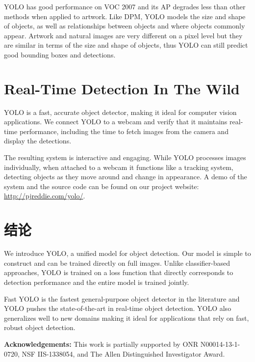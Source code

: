 \documentclass[10pt,twocolumn,letterpaper]{article}
\begin{document}
YOLO has good performance on VOC 2007 and its AP degrades less than other methods when applied to artwork. Like DPM, YOLO models the size and shape
of objects, as well as relationships between objects and where objects commonly appear. Artwork and natural images are very different on a pixel level but they are similar in terms of the size and shape of objects, thus YOLO can still predict good bounding boxes and detections.

\section{Real-Time Detection In The Wild}

YOLO is a fast, accurate object detector, making it ideal for computer vision applications. We connect YOLO to a webcam and verify that it maintains real-time performance, including the time to fetch images from the camera and display the detections.

The resulting system is interactive and engaging. While YOLO processes images individually, when attached to a webcam it functions like a tracking system, detecting objects as they move around and change in appearance. A demo of the system and the source code can be found on our project website: \url{http://pjreddie.com/yolo/}.



\section{结论}

We introduce YOLO, a unified model for object detection. Our model is simple to construct and can be trained directly on full images. Unlike classifier-based approaches, YOLO is trained on a loss function that directly corresponds to detection performance and the entire model is trained jointly.

Fast YOLO is the fastest general-purpose object detector in the literature and YOLO pushes the state-of-the-art in real-time object detection. YOLO also generalizes well to new domains making it ideal for applications that rely on fast, robust object detection.

\noindent\textbf{Acknowledgements:} This work is partially supported by ONR N00014-13-1-0720, NSF IIS-1338054, and The Allen Distinguished Investigator Award.

\end{document}
